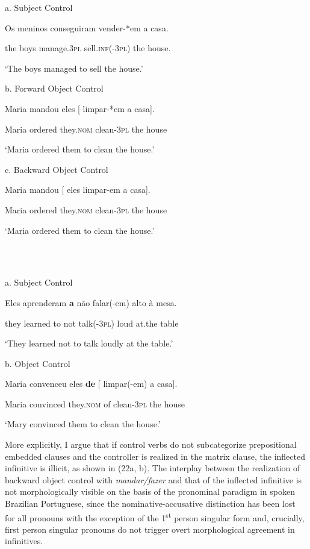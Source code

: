 \documentclass[output=paper]{langsci/langscibook}
\begin{document}
          a.    Subject Control

Os meninos  conseguiram  vender-*em   a casa.  

           the boys  manage.\textsc{3pl}   sell.\textsc{inf}(-\textsc{3pl}) the house.

‘The boys managed to sell the house.’

     b.  Forward Object Control

Maria mandou   eles    [ limpar-*em a    casa].    

    Maria ordered    they.\textsc{nom}   clean{}-\textsc{3pl}     the house

    ‘Maria ordered them  to clean the house.’

c.  Backward Object Control

Maria mandou       [ eles limpar-em a        casa].    

    Maria ordered          they.\textsc{nom}   clean{}-\textsc{3pl}     the house

    ‘Maria ordered them to clean the house.’

\ea%
    \label{ex:moreno:23}
    \gll\\
        \\
    \glt
    \z

          a.  Subject Control

Eles     aprenderam \textbf{a}  não   falar(-em)  alto  à        mesa.

    they    learned         to not    talk({}-\textsc{3pl})    loud at.the table  

    ‘They learned not to talk loudly at the table.’

b.  Object Control

Maria  convenceu eles          \textbf{de}  [  limpar(-em) a    casa].     

Maria  convinced they.\textsc{nom} of     clean-\textsc{3pl}     the house

‘Mary convinced them to clean the house.’

More explicitly, I argue that if control verbs do not subcategorize prepositional embedded clauses and the controller is realized in the matrix clause, the inflected infinitive is illicit, as shown in (22a, b). The interplay between the realization of backward object control with \textit{mandar/fazer} and that of the inflected infinitive is not morphologically visible on the basis of the pronominal paradigm in spoken Brazilian Portuguese, since the nominative-accusative distinction has been lost for all pronouns with the exception of the 1\textsuperscript{st} person singular form and, crucially, first person singular pronouns do not trigger overt morphological agreement in infinitives. 
\end{document}
